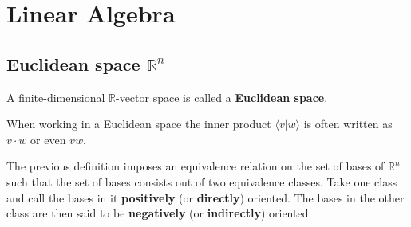 \chapter{Linear Algebra}






\section{Euclidean space \texorpdfstring{$\mathbb{R}^n$}\ }

    A finite-dimensional $\mathbb{R}$-vector space is called a \textbf{Euclidean space}.

    \begin{notation}
        When working in a Euclidean space the inner product $\langle v|w\rangle$ is often written as $v\cdot w$ or even $vw$.
    \end{notation}

    \begin{result}
        The previous definition imposes an equivalence relation on the set of bases of $\mathbb{R}^n$ such that the set of bases consists out of two equivalence classes. Take one class and call the bases in it \textbf{positively} (or \textbf{directly}) oriented. The bases in the other class are then said to be \textbf{negatively} (or \textbf{indirectly}) oriented.
    \end{result}
